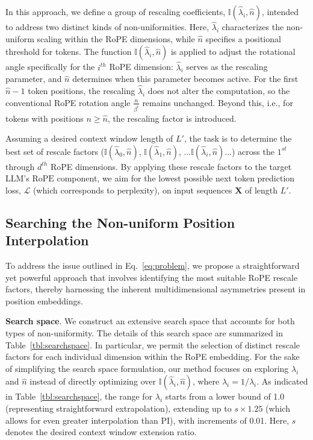 In this approach, we define a group of rescaling coefficients, $\mathbb{I}(\hat{\lambda}_{i},\hat{n})$, intended to address two distinct kinds of non-uniformities. Here, $\hat{\lambda}_{i}$ characterizes the non-uniform scaling within the RoPE dimensions, while $\hat{n}$ specifies a positional threshold for tokens. The function $\mathbb{I}(\hat{\lambda}_{i},\hat{n})$ is applied to adjust the rotational angle specifically for the $i^{th}$ RoPE dimension: $\hat{\lambda}_{i}$ serves as the rescaling parameter, and $\hat{n}$ determines when this parameter becomes active. For the first $\hat{n}-1$ token positions, the rescaling $\hat{\lambda}_{i}$ does not alter the computation, so the conventional RoPE rotation angle $\frac{n}{\beta^i}$ remains unchanged. Beyond this, i.e., for tokens with positions $n \geq \hat{n}$, the rescaling factor is introduced.

Assuming a desired context window length of $L'$, the task is to determine the best set of rescale factors ($\mathbb{I}(\hat{\lambda}_{0},\hat{n})$, $\mathbb{I}(\hat{\lambda}_{1},\hat{n})$, ...$\mathbb{I}(\hat{\lambda}_{i},\hat{n})$...) across the $1^{st}$ through $d^{th}$ RoPE dimensions. By applying these rescale factors to the target $\text{LLM}$'s $\text{RoPE}$ component, we aim for the lowest possible next token prediction loss, $\mathcal{L}$ (which corresponds to perplexity), on input sequences $\mathbf{X}$ of length $L'$.

\subsection{Searching the Non-uniform Position Interpolation}

To address the issue outlined in Eq.~\ref{eq:problem}, we propose a straightforward yet powerful approach that involves identifying the most suitable RoPE rescale factors, thereby harnessing the inherent multidimensional asymmetries present in position embeddings.

\textbf{Search space}. We construct an extensive search space that accounts for both types of non-uniformity. The details of this search space are summarized in Table~\ref{tbl:searchspace}. In particular, we permit the selection of distinct rescale factors for each individual dimension within the RoPE embedding. For the sake of simplifying the search space formulation, our method focuses on exploring $\lambda_i$ and $\hat{n}$ instead of directly optimizing over $\mathbb{I}(\hat{\lambda}_{i},\hat{n})$, where  $\hat{\lambda}_{i}=1/\lambda_i$. As indicated in Table~\ref{tbl:searchspace}, the range for $\lambda_i$ starts from a lower bound of 1.0 (representing straightforward extrapolation), extending up to $s\times1.25$ (which allows for even greater interpolation than PI), with increments of 0.01. Here, $s$ denotes the desired context window extension ratio.

